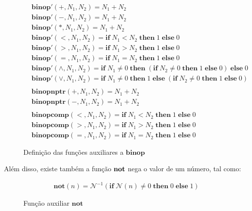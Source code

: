 \begin{figure}[ht]
	\begin{align}
		& \mathbf{binop}'(+, N_1, N_2) = N_1 + N_2 \label{fig:def:binop1}\\
		& \mathbf{binop}'(-, N_1, N_2) = N_1 + N_2\\
		& \mathbf{binop}'(*, N_1, N_2) = N_1 + N_2\\
		& \mathbf{binop}'(<, N_1, N_2) = \mathbf{if}\; N_1 < N_2 \;\mathbf{then}\; 1 \;\mathbf{else} \;0\\
		& \mathbf{binop}'(>, N_1, N_2) = \mathbf{if}\; N_1 > N_2 \;\mathbf{then}\; 1 \;\mathbf{else} \;0\\
		& \mathbf{binop}'(=, N_1, N_2) = \mathbf{if}\; N_1 = N_2 \;\mathbf{then}\; 1 \;\mathbf{else} \;0\\
		& \mathbf{binop}'(\land, N_1, N_2) = \mathbf{if}\; N_1 \neq 0 \;\mathbf{then}\; (\mathbf{if}\; N_2 \neq 0 \;\mathbf{then}\; 1 \;\mathbf{else} \;0) \;\mathbf{else} \;0\\
		& \mathbf{binop}'(\lor, N_1, N_2) = \mathbf{if}\; N_1 \neq 0 \;\mathbf{then}\; 1 \;\mathbf{else} \;(\mathbf{if}\; N_2 \neq 0 \;\mathbf{then}\; 1 \;\mathbf{else} \;0) \label{fig:def:binop2}\\
		\nonumber \\
		& \mathbf{binopnptr}(+, N_1, N_2) = N_1 + N_2  \label{fig:def:binop3}\\
		& \mathbf{binopnptr}(-, N_1, N_2) = N_1 + N_2  \label{fig:def:binop4}\\
		\nonumber \\
		& \mathbf{binopcomp}(<, N_1, N_2) = \mathbf{if}\; N_1 < N_2 \;\mathbf{then}\; 1 \;\mathbf{else} \;0  \label{fig:def:binop5}\\
		& \mathbf{binopcomp}(>, N_1, N_2) = \mathbf{if}\; N_1 > N_2 \;\mathbf{then}\; 1 \;\mathbf{else} \;0  \label{fig:def:binop6}\\
		& \mathbf{binopcomp}(=, N_1, N_2) = \mathbf{if}\; N_1 = N_2 \;\mathbf{then}\; 1 \;\mathbf{else} \;0  \label{fig:def:binop7}
	\end{align}
	\caption{Definição das funções auxiliares a $\mathbf{binop}$}
	\label{fig:def:binop:extra}
\end{figure}
\FloatBarrier

Além disso, existe também a função $\mathbf{not}$ nega o valor de um número, tal como: 
\begin{figure}[ht]
	\begin{align}
		\mathbf{not}(n) = \mathcal{N}^{-1}(\mathbf{if}\; \mathcal{N}(n) \neq 0 \;\mathbf{then}\; 0 \;\mathbf{else} \;1)
	\end{align}
	\caption{Função auxiliar $\mathbf{not}$}
	\label{fig:def:not}
\end{figure}
\FloatBarrier

